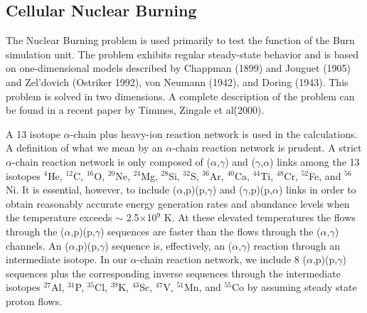 \subsection{Cellular Nuclear Burning}
\label{Sec:SimulationCellular}

The  Nuclear Burning problem is used primarily to test the function of
the Burn simulation unit.  The problem exhibits regular steady-state behavior
and is based on one-dimensional models described by Chappman (1899) and
Jouguet (1905) and Zel'dovich (Ostriker 1992), von Neumann (1942), and
Doring (1943).  This problem is solved in two dimensions.  A complete description
of the problem can be found in a recent paper by Timmes, Zingale et al\. (2000).



A 13 isotope $\alpha$-chain plus heavy-ion reaction network is used
in the calculations.  A definition of what we mean by an
$\alpha$-chain reaction network is prudent. A strict $\alpha$-chain
reaction network is only composed of ($\alpha$,$\gamma$) and
($\gamma$,$\alpha$) links among the 13 isotopes $^4$He, $^{12}$C,
$^{16}$O, $^{20}$Ne, $^{24}$Mg, $^{28}$Si, $^{32}$S, $^{36}$Ar,
$^{40}$Ca, $^{44}$Ti, $^{48}$Cr, $^{52}$Fe, and $^{56}$Ni.  It is
essential, however, to include ($\alpha$,p)(p,$\gamma$) and
($\gamma$,p)(p,$\alpha$) links in order to obtain reasonably accurate
energy generation rates and abundance levels when the temperature
exceeds $\sim$ 2.5$\times$10$^{9}$ K. At these elevated temperatures
the flows through the ($\alpha$,p)(p,$\gamma$) sequences are faster
than the flows through the ($\alpha$,$\gamma$) channels.  An
($\alpha$,p)(p,$\gamma$) sequence is, effectively, an
($\alpha$,$\gamma$) reaction through an intermediate isotope.  In our
$\alpha$-chain reaction network, we include 8 ($\alpha$,p)(p,$\gamma$)
sequences plus the corresponding inverse sequences through the
intermediate isotopes $^{27}$Al, $^{31}$P, $^{35}$Cl, $^{39}$K,
$^{43}$Sc, $^{47}$V, $^{51}$Mn, and $^{55}$Co by assuming steady state
proton flows.  

